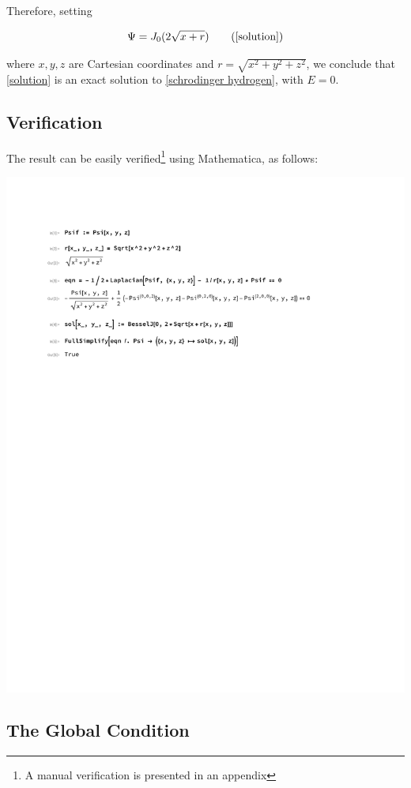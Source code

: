 \documentclass{article}
\begin{document}
Therefore, setting

\begin{equation}
\Psi = J_0(2\sqrt{x+r})
\tag{\ref{solution}}
\end{equation}

where $x,y,z$ are Cartesian coordinates and $r=\sqrt{x^2+y^2+z^2}$, we conclude that
\eqref{solution} is an exact solution to \eqref{schrodinger hydrogen}, with $E=0$.

\subsection*{Verification}

\label{verification}
The result can be easily verified\footnote{A manual verification is presented in an appendix} using Mathematica, as follows:

\includegraphics[page=1, clip, trim=1in 7in 1in 1in, width=\textwidth]{improved.pdf}

\subsection*{The Global Condition}
\end{document}
